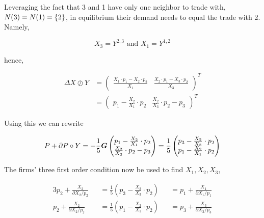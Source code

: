 Leveraging the fact that 3 and 1 have only one neighbor to trade with, $N(3) = N(1) = \left\{2\right\}$, in equilibrium their demand needs to equal the trade with 2. Namely,

\begin{equation}
    X_3 = Y^{2, 3} \text{ and } X_1 = Y^{1, 2}
\end{equation}

hence,

\begin{equation}
    \begin{split}
        \Delta X \oslash Y &= \begin{pmatrix}
            \frac{X_1 \cdot p_1 - X_2 \cdot p_2}{X_1} &
            \frac{X_2 \cdot p_1 - X_3 \cdot p_2}{X_3}
        \end{pmatrix}^{T} \\
        &= \begin{pmatrix}
            p_1 - \frac{X_2}{X_1} \cdot p_2 &
            \frac{X_2}{X_3} \cdot p_2 - p_3
        \end{pmatrix}^{T}
    \end{split}
\end{equation}

Using this we can rewrite

\begin{equation}
    P + \partial P \circ Y = - \frac{1}{5} \bm{G} \begin{pmatrix}
        p_1 - \frac{X_2}{X_1} \cdot p_2 \\
        \frac{X_2}{X_3} \cdot p_2 - p_3
    \end{pmatrix} = \frac{1}{5} \begin{pmatrix}
        p_3 - \frac{X_2}{X_3} \cdot p_2 \\
        p_1 - \frac{X_2}{X_1} \cdot p_2
    \end{pmatrix}
\end{equation}

The firms' three first order condition now be used to find $X_1, X_2, X_3$,

\begin{alignat*}{3}
    p_2 + \frac{X_2}{\partial X_2 / p_2} &  & = \frac{1}{5} \left( p_3 - \frac{X_2}{X_3} \cdot p_2  \right) &  & = p_1 + \frac{X_1}{\partial X_1 / p_1} \\
    p_2 + \frac{X_2}{\partial X_2 / p_2} &  & = \frac{1}{5} \left( p_1 - \frac{X_2}{X_1} \cdot p_2  \right) &  & = p_3 + \frac{X_3}{\partial X_3 / p_3}
\end{alignat*}

